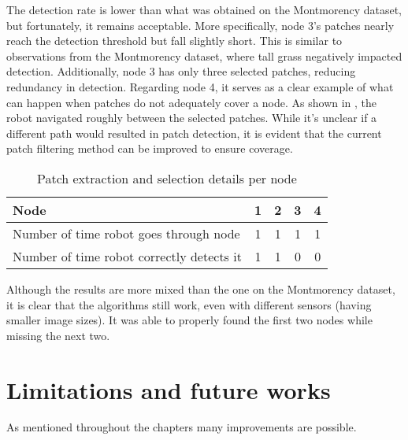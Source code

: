 The detection rate is lower than what was obtained on the Montmorency dataset, but fortunately, it remains acceptable.
More specifically, node 3’s patches nearly reach the detection threshold but fall slightly short.
This is similar to observations from the Montmorency dataset, where tall grass negatively impacted detection.
Additionally, node 3 has only three selected patches, reducing redundancy in detection.
Regarding node 4, it serves as a clear example of what can happen when patches do not adequately cover a node.
As shown in , the robot navigated roughly between the selected patches.
While it’s unclear if a different path would resulted in patch detection, it is evident that the current patch filtering
method can be improved to ensure coverage.

\begin{table}[ht!]
    \centering
    \begin{tabular}{|l|c|c|c|c|}
        \hline
        Node                                      & 1 & 2 & 3 & 4 \\ \hline
        Number of time robot goes through node    & 1 & 1 & 1 & 1 \\ \hline
        Number of time robot correctly detects it & 1 & 1 & 0 & 0 \\ \hline
    \end{tabular}
    \caption{Patch extraction and selection details per node}
    \label{tab:hub_drone:node_detection}
\end{table}

Although the results are more mixed than the one on the Montmorency dataset, it is clear that the algorithms still work, even
with different sensors (having smaller image sizes).
It was able to properly found the first two nodes while missing the next two.


\section{Limitations and future works}\label{sec:limitations-and-future-works}



As mentioned throughout the chapters many improvements are possible.


